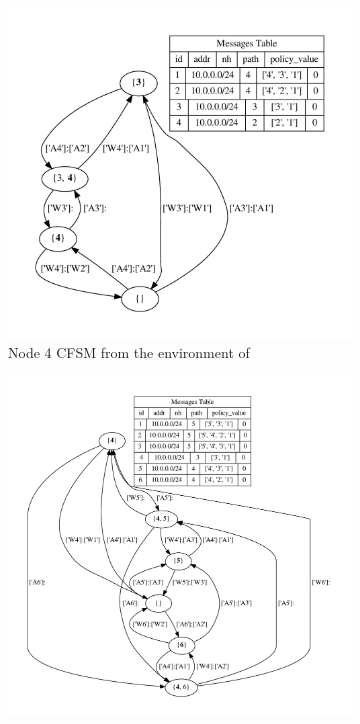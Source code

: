\begin{figure}[h]
     \centering
     \begin{subfigure}[b]{0.49\textwidth}
         \centering
         \includegraphics[width=\textwidth]{images/fsm/fig_4_4.pdf}
		 \caption{Node \num{4} \ac{CFSM} from the environment of }
         \label{fig:fsm_node4}
     \end{subfigure}
     \hfill
     \begin{subfigure}[b]{0.49\textwidth}
         \centering
         \includegraphics[width=\textwidth]{images/fsm/fig_4_5.pdf}

\end{subfigure}
\end{figure}
